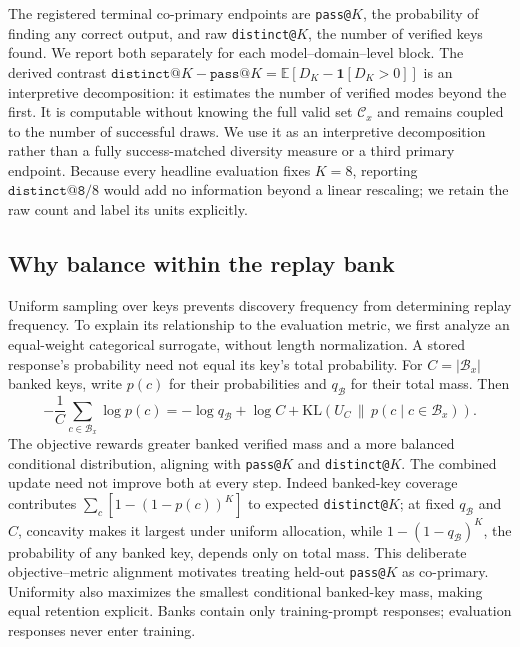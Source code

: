 \documentclass{article}
\newcommand{\1}{\mathbf 1}
\newcommand{\E}{\mathbb E}
\theoremstyle{remark}
\theoremstyle{definition}
\theoremstyle{plain}
\begin{document}
The registered terminal co-primary endpoints are \texttt{pass@}$K$, the
probability of finding any correct output, and raw \texttt{distinct@}$K$, the
number of verified keys found. We report both separately for each
model--domain--level block. The derived contrast
$\texttt{distinct@}K-\texttt{pass@}K
=\E[D_K-\1[D_K>0]]$ is an interpretive decomposition: it estimates the
number of verified modes beyond the first. It is computable without knowing the
full valid set $\mathcal C_x$ and remains coupled to the number of successful
draws. We use it as an interpretive decomposition rather than a fully
success-matched diversity measure or a third primary endpoint. Because every
headline evaluation fixes $K=8$, reporting $\texttt{distinct@8}/8$ would add no
information beyond a linear rescaling; we retain the raw count and label its
units explicitly.


\subsection{Why balance within the replay bank}
\label{app:replay-metric-alignment}

Uniform sampling over keys prevents discovery frequency from determining replay
frequency. To explain its relationship to the evaluation metric, we first
analyze an equal-weight categorical surrogate, without length normalization.
A stored response's probability need not equal its key's total probability.
For $C=|\mathcal B_x|$ banked keys, write $p(c)$ for their probabilities
and $q_{\mathcal B}$ for their total mass. Then
\begin{equation}
 -\frac1C\sum_{c\in\mathcal B_x}\log p(c)
 =-\log q_{\mathcal B}+\log C+
   \mathrm{KL}\!\left(U_C\,\|\,
   p(c\mid c\in\mathcal B_x)\right).
 \label{eq:replay-bank-decomposition}
\end{equation}
The objective rewards greater banked verified mass and a more balanced
conditional distribution, aligning with \texttt{pass@}$K$ and
\texttt{distinct@}$K$. The combined update need not improve both at every step. Indeed banked-key coverage contributes
$\sum_c[1-(1-p(c))^K]$ to expected \texttt{distinct@}$K$; at fixed
$q_{\mathcal B}$ and $C$, concavity makes it largest under uniform allocation,
while $1-(1-q_{\mathcal B})^K$, the probability of any banked key, depends
only on total mass. This deliberate objective--metric alignment motivates
treating held-out \texttt{pass@}$K$ as co-primary. Uniformity also maximizes the
smallest conditional banked-key mass, making equal retention explicit. Banks
contain only training-prompt responses; evaluation responses never enter
training.
\end{document}
